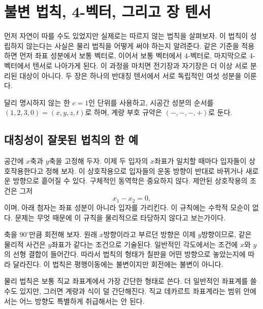 \chapter{불변 법칙, 4-벡터, 그리고 장 텐서}

먼저 자연이 따를 수도 있었지만 실제로는 따르지 않는 법칙을 살펴보자. 이 법칙이 성립하지 않는다는 사실은 물리 법칙을 어떻게 써야 하는지 알려준다. 같은 기준을 적용하면 먼저 좌표 성분에서 보통 벡터로, 이어서 보통 벡터에서 4-벡터로, 마지막으로 4-벡터에서 텐서로 나아가게 된다. 이 과정을 마치면 전기장과 자기장은 더 이상 서로 분리된 대상이 아니다. 두 장은 하나의 반대칭 텐서에서 서로 독립적인 여섯 성분을 이룬다.

달리 명시하지 않는 한 \(c=1\)인 단위를 사용하고, 시공간 성분의 순서를 \((1,2,3,0)=(x,y,z,t)\)로 하며, 계량 부호 규약은 \((-,-,-,+)\)로 둔다.

\section{대칭성이 잘못된 법칙의 한 예}

공간에 \(x\)축과 \(y\)축을 고정해 두자. 이제 두 입자의 \(x\)좌표가 일치할 때마다 입자들이 상호작용한다고 정해 보자. 이 상호작용으로 입자들의 운동 방향이 반대로 바뀌거나 새로운 방향으로 흩어질 수 있다. 구체적인 동역학은 중요하지 않다. 제안된 상호작용의 조건은 그저 \begin{equation}
  x_1-x_2=0,
\end{equation}이며, 아래 첨자는 좌표 성분이 아니라 입자를 가리킨다. 이 규칙에는 수학적 모순이 없다. 문제는 무엇 때문에 이 규칙을 물리적으로 타당하지 않다고 보는가이다.

\begin{classroomqa}\end{classroomqa}

축을 \(90^\circ\)만큼 회전해 보자. 원래 \(x\)방향이라고 부르던 방향은 이제 \(y\)방향이므로, 같은 물리적 사건은 \(y\)좌표가 같다는 조건으로 기술된다. 일반적인 각도에서는 조건에 \(x\)와 \(y\)의 선형 결합이 들어간다. 따라서 법칙의 형태가 칠판을 어떤 방향으로 놓았는지에 따라 달라진다. 이 법칙은 평행이동에는 불변이지만 회전에는 불변이 아니다.

물리 법칙은 보통 직교 좌표계에서 가장 간단한 형태로 쓴다. 더 일반적인 좌표계를 쓸 수도 있지만, 그러면 계량과 식이 덜 간단해진다. 직교 데카르트 좌표계라는 범위 안에서는 어느 방향도 특별하게 취급해서는 안 된다.

